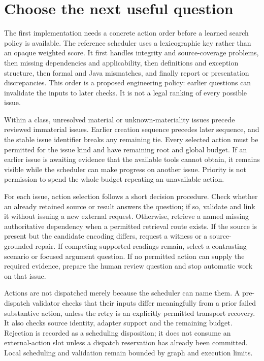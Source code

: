 \section{Choose the next useful question}
\label{merge:M06:14}


The first implementation needs a concrete action order before a learned search
policy is available. The reference scheduler uses a lexicographic key rather
than an opaque weighted score. It first handles integrity and source-coverage
problems, then missing dependencies and applicability, then definitions and
exception structure, then formal and Java mismatches, and finally report or
presentation discrepancies. This order is a proposed engineering policy: earlier
questions can invalidate the inputs to later checks. It is not a legal ranking
of every possible issue.

Within a class, unresolved material or unknown-materiality issues precede reviewed
immaterial issues. Earlier creation sequence precedes later sequence, and the
stable issue identifier breaks any remaining tie. Every selected action must be
permitted for the issue kind and have remaining root and global budget. If an
earlier issue is awaiting evidence that the available tools cannot obtain, it
remains visible while the scheduler can make progress on another issue. Priority
is not permission to spend the whole budget repeating an unavailable action.

For each issue, action selection follows a short decision procedure. Check whether
an already retained source or result answers the question; if so, validate and
link it without issuing a new external request. Otherwise, retrieve a named
missing authoritative dependency when a permitted retrieval route exists. If the
source is present but the candidate encoding differs, request a witness or a
source-grounded repair. If competing supported readings remain, select a
contrasting scenario or focused argument question. If no permitted action can
supply the required evidence, prepare the human review question and stop automatic
work on that issue.


Actions are not dispatched merely because the scheduler can name them. A
pre-dispatch validator checks that their inputs differ meaningfully from a prior
failed substantive action, unless the retry is an explicitly permitted transport
recovery. It also checks source identity, adapter support and the remaining
budget. Rejection is recorded as a scheduling disposition; it does not consume
an external-action slot unless a dispatch reservation has already been committed.
Local scheduling and validation remain bounded by graph and execution limits.

